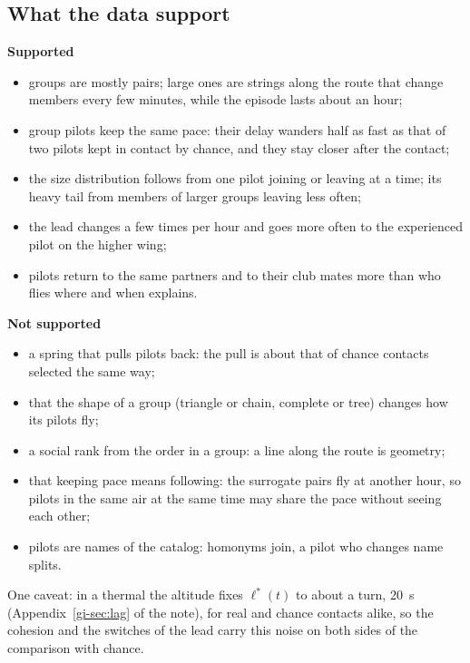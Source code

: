 \subsection{What the data support}\label{sec:conclusions}

\noindent
\begin{minipage}[t]{0.49\textwidth}
\textbf{Supported}
\begin{itemize}
  \item groups are mostly pairs; large ones are strings along the route that change members every
        few minutes, while the episode lasts about an hour;
  \item group pilots keep the same pace: their delay wanders half as fast as that of two pilots
        kept in contact by chance, and they stay closer after the contact;
  \item the size distribution follows from one pilot joining or leaving at a time; its heavy tail
        from members of larger groups leaving less often;
  \item the lead changes a few times per hour and goes more often to the experienced pilot on the
        higher wing;
  \item pilots return to the same partners and to their club mates more than who flies where and
        when explains.
\end{itemize}
\end{minipage}\hfill
\begin{minipage}[t]{0.49\textwidth}
\textbf{Not supported}
\begin{itemize}
  \item a spring that pulls pilots back: the pull is about that of chance contacts selected the
        same way;
  \item that the shape of a group (triangle or chain, complete or tree) changes how its pilots fly;
  \item a social rank from the order in a group: a line along the route is geometry;
  \item that keeping pace means following: the surrogate pairs fly at another hour, so pilots in
        the same air at the same time may share the pace without seeing each other;
  \item pilots are names of the catalog: homonyms join, a pilot who changes name splits.
\end{itemize}
\end{minipage}

\medskip
One caveat: in a thermal the altitude fixes $\ell^*(t)$ to about a turn, 20~s
(Appendix~\ref{gi-sec:lag} of the note), for real and chance contacts alike, so the cohesion and the switches of
the lead carry this noise on both sides of the comparison with chance.
